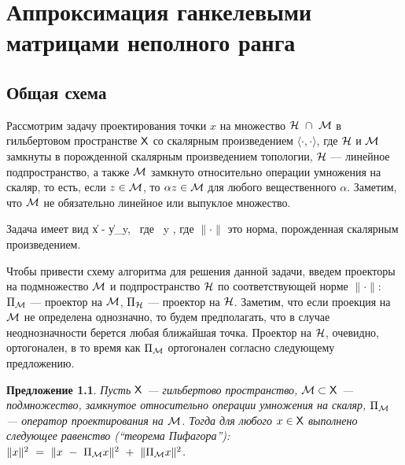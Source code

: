 \documentclass[12pt, specialist, subf,href,colorlinks=true,substylefile = spbu.rtx]{disser}
\newtheorem{proposition}{Предложение}
\theoremstyle{remark}
\theoremstyle{definition}
\begin{document}
\chapter{Аппроксимация ганкелевыми матрицами неполного ранга}
\label{sec:lowrank_appr}
\section{Общая схема}
Рассмотрим задачу проектирования точки $x$ на множество $\mathcal{H}~ \cap~\mathcal{M}$ в гильбертовом пространстве $\mathsf{X}$ со скалярным произведением $\langle \cdot, \cdot \rangle$, где $\mathcal{H}$ и $\mathcal{M}$ замкнуты в порожденной скалярным произведением топологии, $\mathcal{H}$ --- линейное подпространство, а также $\mathcal{M}$ замкнуто относительно операции умножения на скаляр, то есть, если $z \in \mathcal{M}$, то $\alpha z\in \mathcal{M}$ для любого вещественного $\alpha$. Заметим, что $\mathcal{M}$ не обязательно линейное или выпуклое множество.

Задача имеет вид
\be
\label{eq:gen_task}
\|x - y\| \to \min_y, \mbox{\ где\ } y \in \calH \cap \calM,
\ee
где $\|\cdot\|$ это норма, порожденная скалярным произведением.

Чтобы привести схему алгоритма для решения данной задачи, введем проекторы на подмножество $\mathcal{M}$ и подпространство $\mathcal{H}$ по соответствующей норме $\|\cdot\|$: $\Pi_{\mathcal{M}}$ --- проектор на $\mathcal{M}$,
$\Pi_{\mathcal{H}}$ --- проектор на $\mathcal{H}$.
Заметим, что если проекция на $\mathcal{M}$ не определена однозначно, 
то будем предполагать, что в случае неоднозначности берется любая ближайшая точка.
Проектор на $\mathcal{H}$, очевидно, ортогонален, в то время как $\Pi_{\mathcal{M}}$ ортогонален согласно следующему предложению.

\begin{proposition} \label{prop:pythaprop}
	Пусть $\mathsf{X}$ --- гильбертово пространство, $\mathcal{M} \subset \mathsf{X}$ --- подмножество, замкнутое относительно операции умножения на скаляр, $\Pi_{\mathcal{M}}$ --- оператор проектирования на $\mathcal{M}$. Тогда для любого $x \in \mathsf{X}$ выполнено следующее равенство (``теорема Пифагора''): $\|x\|^2~=~\|x~-~\Pi_{\mathcal{M}} x\|^2~+~\|\Pi_{\mathcal{M}} x\|^2$.
\end{proposition}
\end{document}
